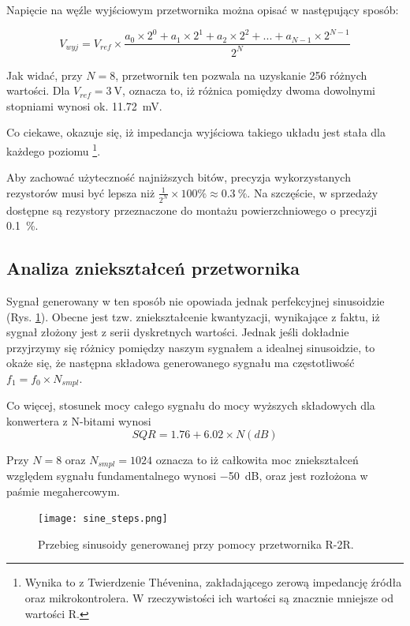 \documentclass[12pt, a4paper]{article}
\begin{document}
Napięcie na węźle wyjściowym przetwornika można opisać w następujący sposób:

\[
	V_{wyj}=V_{ref} \times \frac{a_0 \times 2^0 + a_1 \times 2^1 + a_2 \times 2^2 + ... + a_{N - 1} \times 2^{N- 1}}{2^N}
\]

Jak widać, przy $N=8$, przetwornik ten pozwala na uzyskanie 256 różnych wartości. Dla $V_{ref}=\qty{3}{\volt}$,
oznacza to, iż różnica pomiędzy dwoma dowolnymi stopniami wynosi ok. \qty{11,72}{\mV}.

Co ciekawe, okazuje się, iż impedancja wyjściowa takiego układu jest stała dla każdego poziomu
\footnote{
	Wynika to z Twierdzenie Thévenina, zakładającego zerową impedancję źródła oraz mikrokontrolera. 
	W rzeczywistości ich wartości są znacznie mniejsze od wartości R.
}.

Aby zachować użyteczność najniższych bitów, precyzja wykorzystanych rezystorów musi być lepsza niż
$\frac{1}{2^N} \times 100\unit{\percent} \approx \qty{0,3}{\%}$. Na szczęście,
w sprzedaży dostępne są rezystory przeznaczone do montażu powierzchniowego o precyzji \qty{0,1}{\%}.

\subsection{Analiza zniekształceń przetwornika}

Sygnał generowany w ten sposób nie opowiada jednak perfekcyjnej sinusoidzie (Rys. \ref{fig:sine-stepped}).
Obecne jest tzw. zniekształcenie kwantyzacji, wynikające z faktu, iż sygnał złożony jest 
z serii dyskretnych wartości. Jednak jeśli dokładnie przyjrzymy się różnicy pomiędzy naszym sygnałem
a idealnej sinusoidzie, to okaże się, że następna składowa generowanego sygnału ma częstotliwość $f_1 = f_0 \times N_{smpl}$.

Co więcej, stosunek mocy całego sygnału do mocy wyższych składowych dla konwertera z N-bitami wynosi
\begin{equation}
	SQR = 1.76 + 6.02 \times N (dB)
\end{equation}

Przy $N=8$ oraz $N_{smpl}=1024$ oznacza to iż całkowita moc zniekształceń względem sygnału fundamentalnego wynosi \qty{-50}{\dB}, 
oraz jest rozłożona w paśmie megahercowym.

\begin{figure}[h]
	\centering
	\texttt{[image: sine\_steps.png]}
	\caption{Przebieg sinusoidy generowanej przy pomocy przetwornika R-2R.}
	\label{fig:sine-stepped}
\end{figure}
\end{document}
